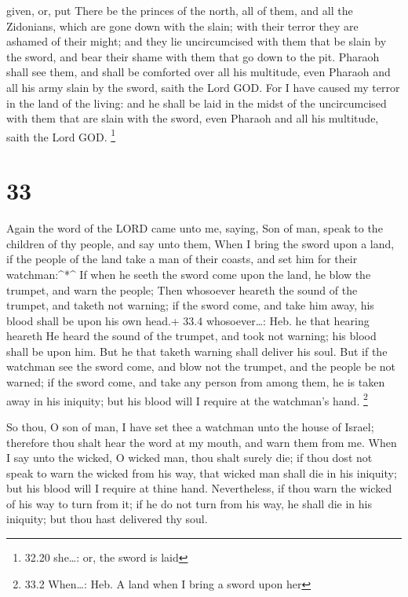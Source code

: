given, or, put  There be the princes of the north, all of
them, and all the Zidonians, which are gone down with the slain; with
their terror they are ashamed of their might; and they lie uncircumcised
with them that be slain by the sword, and bear their shame with them
that go down to the pit.  Pharaoh shall see them, and shall
be comforted over all his multitude, even Pharaoh and all his army slain
by the sword, saith the Lord GOD.  For I have caused my
terror in the land of the living: and he shall be laid in the midst of
the uncircumcised with them that are slain with the sword, even Pharaoh
and all his multitude, saith the Lord GOD. \footnote{32.20 she\ldots:
  or, the sword is laid}

\hypertarget{section-32}{%
\section{33}\label{section-32}}

 Again the word of the LORD came unto me, saying,
 Son of man, speak to the children of thy people, and say
unto them, When I bring the sword upon a land, if the people of the land
take a man of their coasts, and set him for their watchman:\^{}*\^{}
 If when he seeth the sword come upon the land, he blow the
trumpet, and warn the people;  Then whosoever heareth the
sound of the trumpet, and taketh not warning; if the sword come, and
take him away, his blood shall be upon his own head.+ 33.4
whosoever\ldots: Heb. he that hearing heareth  He heard the
sound of the trumpet, and took not warning; his blood shall be upon him.
But he that taketh warning shall deliver his soul.  But if
the watchman see the sword come, and blow not the trumpet, and the
people be not warned; if the sword come, and take any person from among
them, he is taken away in his iniquity; but his blood will I require at
the watchman's hand. \footnote{33.2 When\ldots: Heb. A land when I bring
  a sword upon her}

 So thou, O son of man, I have set thee a watchman unto the
house of Israel; therefore thou shalt hear the word at my mouth, and
warn them from me.  When I say unto the wicked, O wicked
man, thou shalt surely die; if thou dost not speak to warn the wicked
from his way, that wicked man shall die in his iniquity; but his blood
will I require at thine hand.  Nevertheless, if thou warn
the wicked of his way to turn from it; if he do not turn from his way,
he shall die in his iniquity; but thou hast delivered thy soul.

